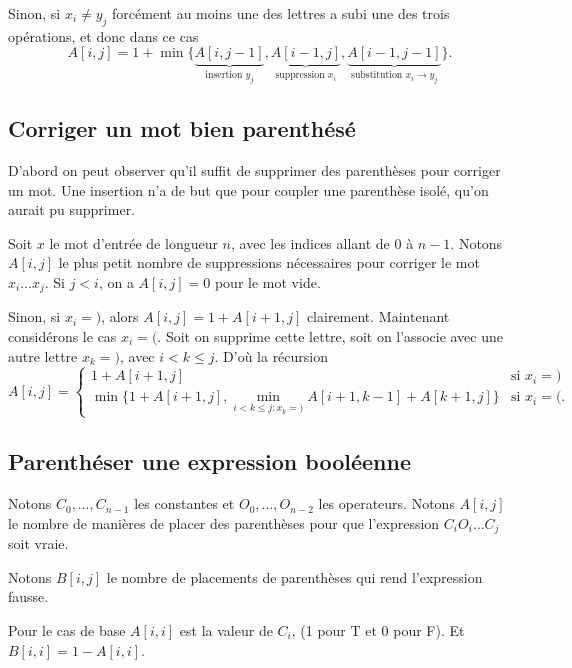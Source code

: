 \documentclass[12pt]{article}
\begin{document}
Sinon, si $x_i\neq y_j$ forcément au moins une des lettres a subi une des trois opérations, et donc dans ce cas
\[
A[i,j] = 1 + \min\{ \underbrace{A[ i,j-1 ]}_{\textrm{insertion $y_j$}}, 
 \underbrace{A[i-1,j]}_{\textrm{suppression $x_i$}}, 
 \underbrace{A[i-1,j-1]}_{\textrm{substitution $x_i \rightarrow y_j$}} \}.
\]

\subsection{Corriger un mot bien parenthésé}

D'abord on peut observer qu'il suffit de supprimer des parenthèses pour corriger un mot. Une insertion n'a de but que pour coupler une parenthèse isolé, qu'on aurait pu supprimer.

Soit $x$ le mot d'entrée de longueur $n$, avec les indices allant de $0$ à $n-1$.
Notons $A[i,j]$ le plus petit nombre de suppressions nécessaires pour corriger le mot $x_i\ldots x_j$.  
Si $j<i$, on a $A[i,j]=0$ pour le mot vide.

Sinon, si $x_i=)$, alors $A[i,j]=1+A[i+1,j]$ clairement.
Maintenant considérons le cas $x_i=($.  Soit on supprime cette lettre, soit on l'associe avec une autre lettre $x_k=)$, avec $i<k\leq j$. D'où la récursion
\[
A[i,j] = 
\left\{
    \begin{array}{ll}
    1 + A[i+1,j] & \textrm{si } x_i=)
    \\
    \min\{1+A[i+1,j], \min_{i<k\leq j:x_k=)} A[i+1,k-1]+A[k+1,j]\} & \textrm{si } x_i=(.
    \end{array}
\right.
\]

\subsection{Parenthéser une expression booléenne}

Notons $C_0,\ldots, C_{n-1}$ les constantes et $O_{0},\ldots,O_{n-2}$ les operateurs.
Notons $A[i,j]$ le nombre de manières de placer des parenthèses pour que l'expression $C_i O_i \ldots C_j$ soit vraie.

Notons $B[i,j]$ le nombre de placements de parenthèses qui rend l'expression fausse. 

Pour le cas de base $A[i,i]$ est la valeur de $C_i$, (1 pour T et 0 pour F).
Et $B[i,i]=1-A[i,i]$.
\end{document}
